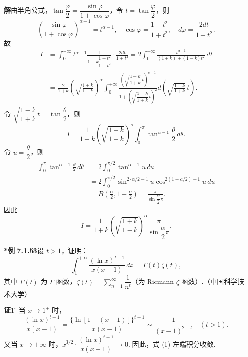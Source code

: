 \documentclass[UTF8,12pt,a4paper,fontset=fandol]{ctexart}
\begin{document}
\noindent\textbf{解}\quad 由半角公式，$\tan\dfrac\varphi2=\dfrac{\sin\varphi}{1+\cos\varphi}$，令 $t=\tan\dfrac\varphi2$，则
\[
\left(\frac{\sin\varphi}{1+\cos\varphi}\right)^{\alpha-1}=t^{\alpha-1},\quad
\cos\varphi=\frac{1-t^2}{1+t^2},\quad
d\varphi=\frac{2dt}{1+t^2}.
\]
故
\[
\begin{aligned}
I&=\int_0^{+\infty}t^{\alpha-1}\frac1{1+k\dfrac{1-t^2}{1+t^2}}\cdot\frac{2dt}{1+t^2}
=2\int_0^{+\infty}\frac{t^{\alpha-1}}{(1+k)+(1-k)t^2}\,dt\\
&=\frac2{1+k}\left(\sqrt{\frac{1+k}{1-k}}\right)^\alpha
\int_0^{+\infty}
\frac{\left(\sqrt{\dfrac{1-k}{1+k}}\,t\right)^{\alpha-1}}
{1+\left(\sqrt{\dfrac{1-k}{1+k}}\,t\right)^2}
d\left(\sqrt{\frac{1-k}{1+k}}\,t\right).
\end{aligned}
\tag{1}
\]
令 $\sqrt{\dfrac{1-k}{1+k}}\,t=\tan\dfrac\theta2$，则
\[
I=\frac1{1+k}\left(\sqrt{\frac{1+k}{1-k}}\right)^\alpha
\int_0^\pi\tan^{\alpha-1}\frac\theta2\,d\theta.
\tag{2}
\]
令 $u=\dfrac\theta2$，则
\[
\begin{aligned}
\int_0^\pi\tan^{\alpha-1}\frac\theta2\,d\theta
&=2\int_0^{\pi/2}\tan^{\alpha-1}u\,du\\
&=2\int_0^{\pi/2}\sin^{2\cdot\alpha/2-1}u\cos^{2(1-\alpha/2)-1}u\,du\\
&=B\left(\frac\alpha2,1-\frac\alpha2\right)
=\frac{\pi}{\sin\dfrac\alpha2\pi}.
\end{aligned}
\tag{3}
\]
因此
\[
I=\frac1{1+k}\left(\sqrt{\frac{1+k}{1-k}}\right)^\alpha
\frac{\pi}{\sin\dfrac\alpha2\pi}.
\]

\noindent\textbf{*例 7.1.53}\quad 设 $t>1$，证明：
\[
\int_1^{+\infty}\frac{(\ln x)^{t-1}}{x(x-1)}\,dx=\Gamma(t)\zeta(t),
\tag{1}
\]
其中 $\Gamma(t)$ 为 $\Gamma$ 函数，$\zeta(t)=\displaystyle\sum_{n=1}^{\infty}\dfrac1{n^t}$（为 Riemann $\zeta$ 函数）.（中国科学技术大学）

\noindent\textbf{证}\quad $1^\circ$ 当 $x\to1^+$ 时，
\[
\frac{(\ln x)^{t-1}}{x(x-1)}
=\frac{\{\ln[1+(x-1)]\}^{t-1}}{x(x-1)}
\sim\frac1{(x-1)^{2-t}}\quad(t>1).
\]
又当 $x\to+\infty$ 时，$x^{3/2}\cdot\dfrac{(\ln x)^{t-1}}{x(x-1)}\to0$. 因此，式 (1) 左端积分收敛.
\end{document}
